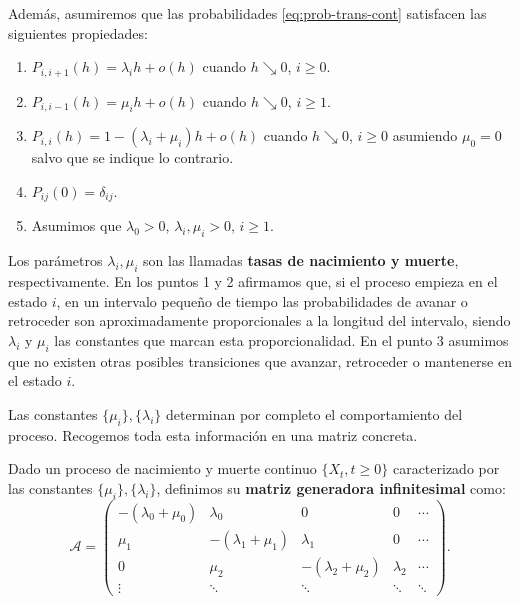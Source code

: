     Además, asumiremos que las probabilidades \eqref{eq:prob-trans-cont} satisfacen las siguientes propiedades:

    \begin{enumerate}
        \item $P_{i,i+1}(h) = \lambda_i h + o(h)$ cuando $h\searrow 0$, $i\geq 0$.
        \item $P_{i,i-1}(h) = \mu_i h + o(h)$ cuando $h\searrow 0$, $i\geq 1$.
        \item $P_{i,i}(h) = 1 - (\lambda_i + \mu_i) h + o(h)$  cuando $h\searrow 0$, $i\geq 0$ asumiendo $\mu_0=0$ salvo que se indique lo contrario.
        \item $P_{ij}(0)=\delta_{ij}$.
        \item Asumimos que $\lambda_0>0$, $\lambda_i, \mu_i > 0$, $i\geq 1$.
    \end{enumerate}

    Los parámetros $\lambda_i, \mu_i$ son las llamadas \textbf{tasas de nacimiento y muerte}, respectivamente. En los puntos 1 y 2 afirmamos que, si el proceso empieza en el estado $i$, en un intervalo pequeño de tiempo las probabilidades de avanar o retroceder son aproximadamente proporcionales a la longitud del intervalo, siendo $\lambda_i$ y $\mu_i$ las constantes que marcan esta proporcionalidad. En el punto 3 asumimos que no existen otras posibles transiciones que avanzar, retroceder o mantenerse en el estado $i$.

    Las constantes $\{\mu_i\}, \{\lambda_i\}$ determinan por completo el comportamiento del proceso. Recogemos toda esta información en una matriz concreta.
    
    \begin{definicion}
        Dado un proceso de nacimiento y muerte continuo $\{X_t, t\geq 0\}$ caracterizado por las constantes $\{\mu_i\}, \{\lambda_i\}$, definimos su \textbf{matriz generadora infinitesimal} como:
        \begin{equation}
            \label{eq:matrix-generadora}
            \mathcal A = \begin{pmatrix}
                -(\lambda_0+\mu_0) & \lambda_0 & 0 & 0 & \cdots \\
                \mu_1 & -(\lambda_1+\mu_1) & \lambda_1 & 0 & \cdots \\
                0 & \mu_2 & -(\lambda_2+\mu_2) & \lambda_2 & \cdots \\
                \vdots & \ddots & \ddots & \ddots & \ddots
            \end{pmatrix}.
        \end{equation}
    \end{definicion}

